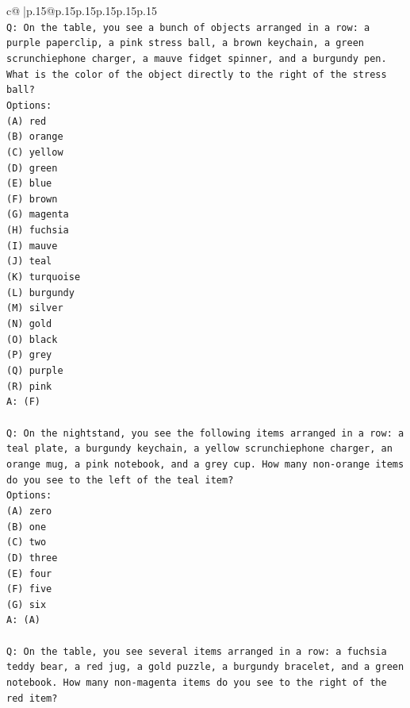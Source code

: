 \documentclass{article}
\begin{document}
{\begin{supertabular}{c@{$\;$}|p{.15\linewidth}@{}p{.15\linewidth}p{.15\linewidth}p{.15\linewidth}p{.15\linewidth}p{.15\linewidth}}
{{{\\ 
\texttt{Q: On the table, you see a bunch of objects arranged in a row: a purple paperclip, a pink stress ball, a brown keychain, a green scrunchiephone charger, a mauve fidget spinner, and a burgundy pen. What is the color of the object directly to the right of the stress ball?} \\
\texttt{Options:} \\
\texttt{(A) red} \\
\texttt{(B) orange} \\
\texttt{(C) yellow} \\
\texttt{(D) green} \\
\texttt{(E) blue} \\
\texttt{(F) brown} \\
\texttt{(G) magenta} \\
\texttt{(H) fuchsia} \\
\texttt{(I) mauve} \\
\texttt{(J) teal} \\
\texttt{(K) turquoise} \\
\texttt{(L) burgundy} \\
\texttt{(M) silver} \\
\texttt{(N) gold} \\
\texttt{(O) black} \\
\texttt{(P) grey} \\
\texttt{(Q) purple} \\
\texttt{(R) pink} \\
\texttt{A: (F)} \\
\\ 
\texttt{Q: On the nightstand, you see the following items arranged in a row: a teal plate, a burgundy keychain, a yellow scrunchiephone charger, an orange mug, a pink notebook, and a grey cup. How many non{-}orange items do you see to the left of the teal item?} \\
\texttt{Options:} \\
\texttt{(A) zero} \\
\texttt{(B) one} \\
\texttt{(C) two} \\
\texttt{(D) three} \\
\texttt{(E) four} \\
\texttt{(F) five} \\
\texttt{(G) six} \\
\texttt{A: (A)} \\
\\ 
\texttt{Q: On the table, you see several items arranged in a row: a fuchsia teddy bear, a red jug, a gold puzzle, a burgundy bracelet, and a green notebook. How many non{-}magenta items do you see to the right of the red item?} \\
}}}
\end{supertabular}}
\end{document}
